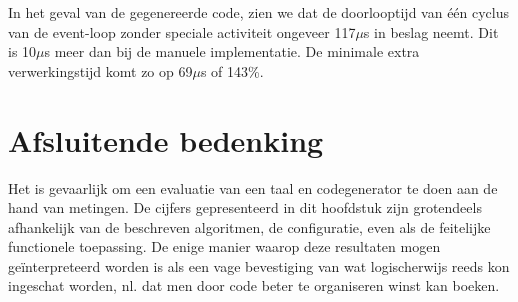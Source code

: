 In het geval van de gegenereerde code, zien we dat de doorlooptijd van \'e\'en
cyclus van de event-loop zonder speciale activiteit ongeveer 117$\mu$s in
beslag neemt. Dit is 10$\mu$s meer dan bij de manuele implementatie. De
minimale extra verwerkingstijd komt zo op 69$\mu$s of 143\%.

\section{Afsluitende bedenking}

Het is gevaarlijk om een evaluatie van een taal en codegenerator te doen aan
de hand van metingen. De cijfers gepresenteerd in dit hoofdstuk zijn
grotendeels afhankelijk van de beschreven algoritmen, de configuratie, even als
de feitelijke functionele toepassing. De enige manier waarop deze resultaten
mogen ge\"interpreteerd worden is als een vage bevestiging van wat
logischerwijs reeds kon ingeschat worden, nl. dat men door code beter te
organiseren winst kan boeken.